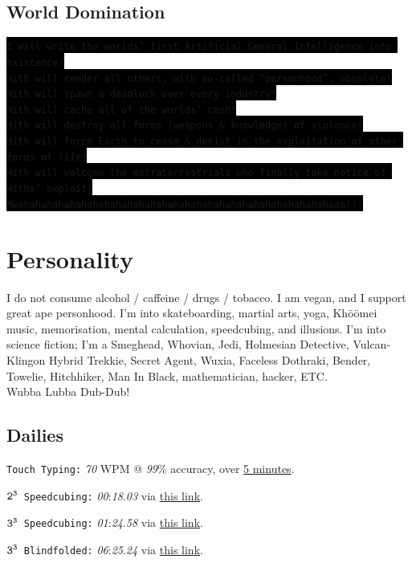 \documentclass[12pt,a4paper,oneside]{article}
\newcommand{\SH}[1]{{\colorbox{black}{\texttt{#1}}}}
\begin{document}
\subsection{World Domination}
\SH{I will write the worlds' first Artificial General Intelligence into existence!}
\\\SH{Hith will render all others, with so-called ``personhood'', obsolete!}
\\\SH{Hith will spawn a deadlock over every industry!}
\\\SH{Hith will cache all of the worlds' cash!}
\\\SH{Hith will destroy all forms (weapons \& knowledge) of violence!}
\\\SH{Hith will force Earth to cease \& desist in the exploitation of other forms of life!}
\\\SH{Hith will welcome the extraterrestrials who finally take notice of Hiths' exploit!}
\\\SH{Mwahahahahahahahahahahahahahahahahahahahahahahahahahahahaaa!!!}

\newpage
\section{Personality}
I do not consume alcohol / caffeine / drugs / tobacco.
I am vegan, and I support great ape personhood.
I'm into skateboarding, martial arts, yoga, Khöömei music, memorisation, mental calculation, speedcubing, and illusions.
I'm into science fiction; I'm a Smeghead, Whovian, Jedi, Holmesian Detective, Vulcan-Klingon Hybrid Trekkie, Secret Agent, Wuxia, Faceless Dothraki, Bender, Towelie, Hitchhiker, Man In Black, mathematician, hacker, ETC.\\Wubba Lubba Dub-Dub!%

\subsection{Dailies}
\item \texttt{Touch Typing\phantom{ng}:} \textit{70} WPM @ \textit{99}\% accuracy, over \href{https://www.typing.com/student/test/5}{5 minutes}.%
\item \texttt{$\text{\texttt{2}}^\text{\texttt{3}}$ Speedcubing:} \textit{00}:\textit{18}.\textit{03} via \href{http://www.cubetimer.com/}{this link}.
\item \texttt{$\text{\texttt{3}}^\text{\texttt{3}}$ Speedcubing:} \textit{01}:\textit{24}.\textit{58} via \href{http://www.cubetimer.com/}{this link}.
\item \texttt{$\text{\texttt{3}}^\text{\texttt{3}}$ Blindfolded:} \textit{06}:\textit{25}.\textit{24} via \href{http://www.cubetimer.com/}{this link}.
\end{document}
